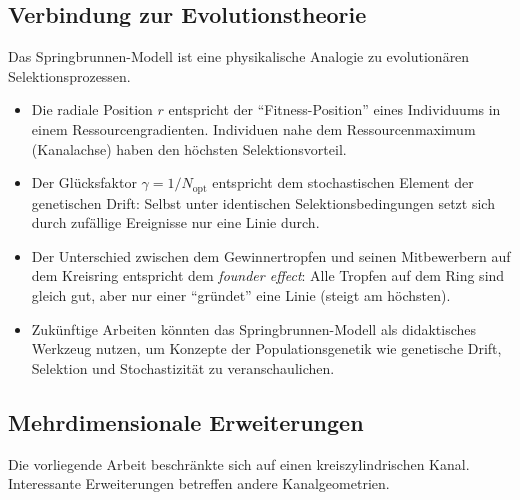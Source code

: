 ﻿\documentclass[a4paper,12pt]{article}
\theoremstyle{definition}
\begin{document}
\subsection{Verbindung zur Evolutionstheorie}

Das Springbrunnen-Modell ist eine physikalische Analogie zu evolutionären Selektionsprozessen.

\begin{itemize}
    \item Die radiale Position $r$ entspricht der ``Fitness-Position'' eines Individuums
          in einem Ressourcengradienten. Individuen nahe dem Ressourcenmaximum (Kanalachse)
          haben den höchsten Selektionsvorteil.
    \item Der Glücksfaktor $\gamma = 1/N_{\text{opt}}$ entspricht dem stochastischen
          Element der genetischen Drift: Selbst unter identischen Selektionsbedingungen
          setzt sich durch zufällige Ereignisse nur eine Linie durch.
    \item Der Unterschied zwischen dem Gewinnertropfen und seinen Mitbewerbern auf
          dem Kreisring entspricht dem \emph{founder effect}: Alle Tropfen auf dem Ring
          sind gleich gut, aber nur einer ``gründet'' eine Linie (steigt am höchsten).
    \item Zukünftige Arbeiten könnten das Springbrunnen-Modell als didaktisches Werkzeug
          nutzen, um Konzepte der Populationsgenetik wie genetische Drift, Selektion und
          Stochastizität zu veranschaulichen.
\end{itemize}

\subsection{Mehrdimensionale Erweiterungen}

Die vorliegende Arbeit beschränkte sich auf einen kreiszylindrischen Kanal.
Interessante Erweiterungen betreffen andere Kanalgeometrien.
\end{document}
